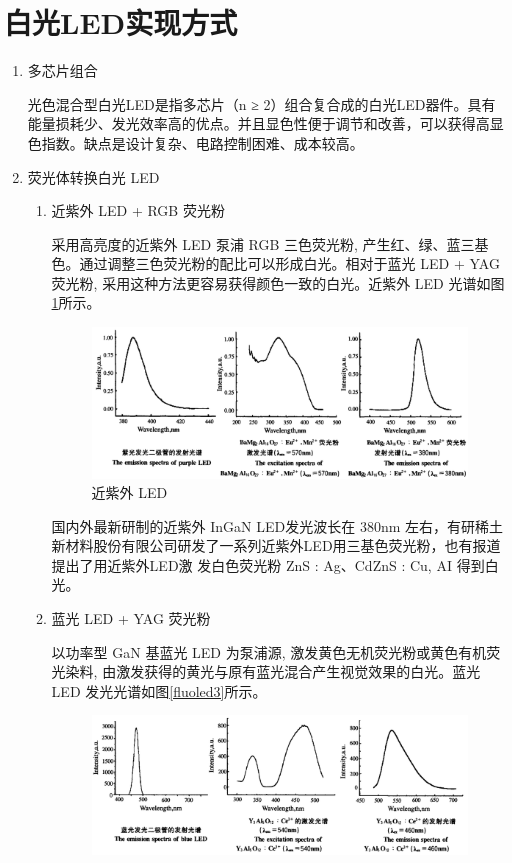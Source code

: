 \section{白光LED实现方式}
\begin{enumerate}
\item 多芯片组合

\CJKindent 光色混合型白光LED是指多芯片（n ≥ 2）组合复合成的白光LED器件。具有能量损耗少、发光效率高的优点。并且显色性便于调节和改善，可以获得高显色指数。缺点是设计复杂、电路控制困难、成本较高。

\item 荧光体转换白光 LED
\begin{enumerate}
\item 近紫外 LED + RGB 荧光粉\cite{powerled1}

	\CJKindent 采用高亮度的近紫外 LED 泵浦 RGB 三色荧光粉, 产生红、绿、蓝三基色。通过调整三色荧光粉的配比可以形成白光。相对于蓝光 LED + YAG 荧光粉, 采用这种方法更容易获得颜色一致的白光。近紫外 LED 光谱如图\ref{fluoled2}所示。

\begin{figure}[h]
\centering
\includegraphics[scale=0.3]{fluoled2}

\caption{近紫外 LED \label{fluoled2}}
\end{figure}

\CJKindent 国内外最新研制的近紫外 InGaN LED发光波长在 380nm 左右，有研稀土新材料股份有限公司研发了一系列近紫外LED用三基色荧光粉，也有报道提出了用近紫外LED激 发白色荧光粉 ZnS : Ag、CdZnS : Cu, AI 得到白光\cite{fluoled}。

\item 蓝光 LED + YAG 荧光粉

	\CJKindent 以功率型 GaN 基蓝光 LED 为泵浦源, 激发黄色无机荧光粉或黄色有机荧光染料, 由激发获得的黄光与原有蓝光混合产生视觉效果的白光。蓝光 LED 发光光谱如图\ref{fluoled3}所示。

\begin{figure}[h]
\centering
\includegraphics[scale=0.3]{fluoled3}


\end{figure}
\end{enumerate}
\end{enumerate}
